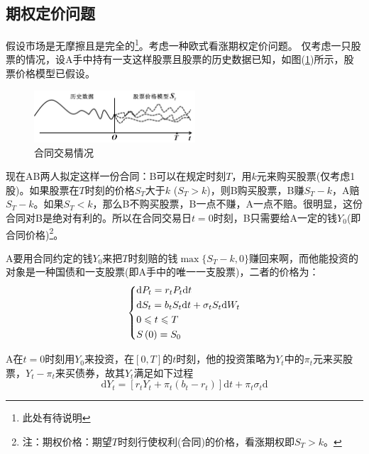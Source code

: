 	\subsection{期权定价问题}
		\label{subsec:期权定价问题}
		\par
		假设市场是无摩擦且是完全的\footnote{此处有待说明}。考虑一种欧式看涨期权定价问题。
		仅考虑一只股票的情况，设A手中持有一支这样股票且股票的历史数据已知，如图(\ref{fig:合同交易情况})所示，股票价格模型已假设。
		\begin{figure}[H]
		\centering
		\includegraphics[width=6cm]{images/Contract_transaction.jpg}
		\caption{合同交易情况}
		\label{fig:合同交易情况}
		\end{figure}
		\par
		现在AB两人拟定这样一份合同：B可以在规定时刻$T$，用$k$元来购买股票(仅考虑1股)。如果股票在$T$时刻的价格$S_T$大于$k$ ($S_T>k$)，则B购买股票，B赚${S_T}-k$，A赔${S_T}-k$。如果$S_T<k$，那么B不购买股票，B一点不赚，A一点不赔。很明显，这份合同对B是绝对有利的。所以在合同交易日$t=0$时刻，B只需要给A一定的钱$Y_0$(即合同价格)\footnote{注：期权价格：期望$T$时刻行使权利(合同)的价格，看涨期权即$S_T>k$。}。
		\par
		A要用合同约定的钱$Y_0$来把$T$时刻赔的钱$\max\{S_T-k,0\}$赚回来啊，而他能投资的对象是一种国债和一支股票(即A手中的唯一一支股票)，二者的价格为：
		\begin{equation*}
			\centering
			\left\{\begin{lgathered}
			{\mathrm{d}{P_t} = {r_t} {P_t} \mathrm{d}t}\\
			{\mathrm{d}{S_t} = {b_t}{S_t}\mathrm{d}t + {\sigma _t}{S_t}\mathrm{d}{W_t}}\\
			{0 \leqslant t \leqslant T}\\
			{S\left( 0 \right) = {S_0}}
			\end{lgathered} \right.
		\end{equation*}
		\par
		A在$t=0$时刻用$Y_0$来投资，在$[0,T]$的$t$时刻，他的投资策略为$Y_t$中的$\pi_t$元来买股票，${Y_t}-{\pi_t}$来买债券，故其$Y_t$满足如下过程
		\begin{equation*}
			{\mathrm{d}{{Y_t}}} = \left[ {{r_t}{Y_t} + {\pi _t}\left( {{b_t} - {r_t}} \right)} \right]{\mathrm{d}t} + {\pi _t}  {\sigma _t} \mathrm{d}{}
		\end{equation*}

